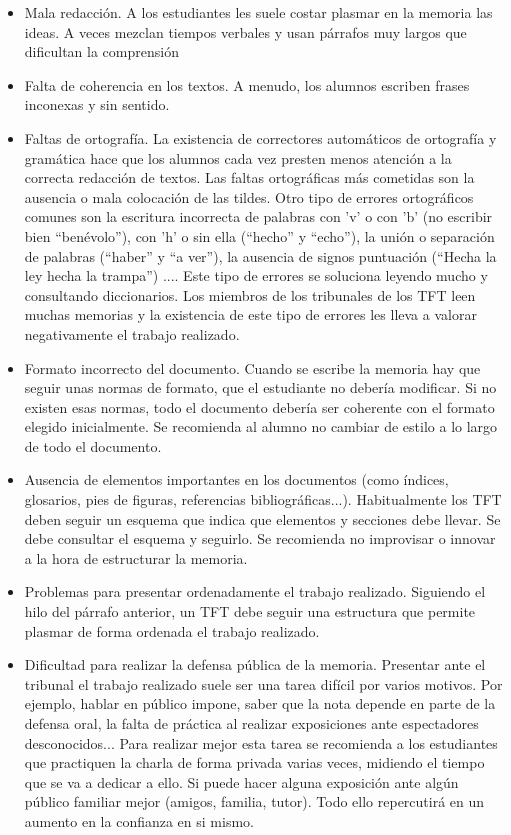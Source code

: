 \documentclass[12pt,spanish,chapterprefix, numbers=noenddot]{book}
\numberwithin{equation}{section}
\numberwithin{figure}{section}
\begin{document}
    \begin{itemize}
        \item Mala redacción. A los estudiantes les suele costar plasmar en la memoria
        las ideas. A veces mezclan tiempos verbales y usan párrafos muy largos
        que dificultan la comprensión
        \item Falta de coherencia en los textos. A menudo, los alumnos escriben
        frases inconexas y sin sentido.
        \item Faltas de ortografía. La existencia de correctores automáticos de
        ortografía y gramática hace que los alumnos cada vez presten menos
        atención a la correcta redacción de textos. Las faltas ortográficas
        más cometidas son la ausencia o mala colocación de las tildes. Otro
        tipo de errores ortográficos comunes son la escritura incorrecta de
        palabras con 'v' o con 'b' (no escribir bien ``benévolo''), con
        'h' o sin ella (``hecho'' y ``echo''), la unión o separación de
        palabras (``haber'' y ``a ver''), la ausencia de signos puntuación
        (``Hecha la ley hecha la trampa'') .... Este tipo de errores se
        soluciona leyendo mucho y consultando diccionarios. Los miembros de
        los tribunales de los TFT leen muchas memorias y la existencia de
        este tipo de errores les lleva a valorar negativamente el trabajo
        realizado.
        \item Formato incorrecto del documento. Cuando se escribe la memoria hay
        que seguir unas normas de formato, que el estudiante no debería modificar.
        Si no existen esas normas, todo el documento debería ser coherente
        con el formato elegido inicialmente. Se recomienda al alumno no cambiar
        de estilo a lo largo de todo el documento.
        \item Ausencia de elementos importantes en los documentos (como índices,
        glosarios, pies de figuras, referencias bibliográficas...). Habitualmente
        los TFT deben seguir un esquema que indica que elementos y secciones
        debe llevar. Se debe consultar el esquema y seguirlo. Se recomienda
        no improvisar o innovar a la hora de estructurar la memoria.
        \item Problemas para presentar ordenadamente el trabajo realizado. Siguiendo
        el hilo del párrafo anterior, un TFT debe seguir una estructura que
        permite plasmar de forma ordenada el trabajo realizado.
        \item Dificultad para realizar la defensa pública de la memoria. Presentar
        ante el tribunal el trabajo realizado suele ser una tarea difícil
        por varios motivos. Por ejemplo, hablar en público impone, saber que
        la nota depende en parte de la defensa oral, la falta de práctica
        al realizar exposiciones ante espectadores desconocidos... Para realizar
        mejor esta tarea se recomienda a los estudiantes que practiquen la
        charla de forma privada varias veces, midiendo el tiempo que se va
        a dedicar a ello. Si puede hacer alguna exposición ante algún público
        familiar mejor (amigos, familia, tutor). Todo ello repercutirá en
        un aumento en la confianza en si mismo.
    \end{itemize}
\end{document}
